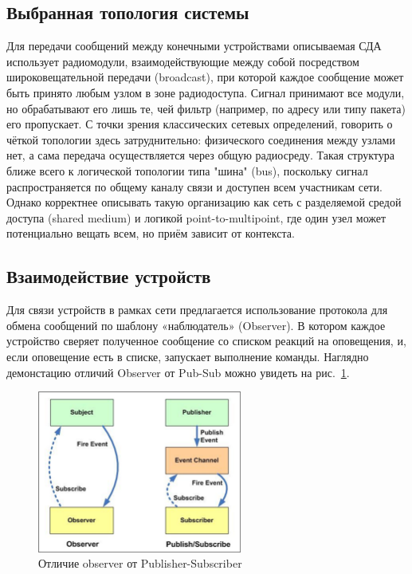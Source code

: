 \documentclass[a4paper,12pt]{article}
\begin{document}
\subsection{Выбранная топология системы}
Для передачи сообщений между конечными устройствами описываемая СДА использует радиомодули, взаимодействующие между собой посредством широковещательной передачи (broadcast), при которой каждое сообщение может быть принято любым узлом в зоне радиодоступа. Сигнал принимают все модули, но обрабатывают его лишь те, чей фильтр (например, по адресу или типу пакета) его пропускает. С точки зрения классических сетевых определений, говорить о чёткой топологии здесь затруднительно: физического соединения между узлами нет, а сама передача осуществляется через общую радиосреду. Такая структура ближе всего к логической топологии типа "шина" (bus), поскольку сигнал распространяется по общему каналу связи и доступен всем участникам сети. Однако корректнее описывать такую организацию как сеть с разделяемой средой доступа (shared medium) и логикой point-to-multipoint, где один узел может потенциально вещать всем, но приём зависит от контекста.

\subsection{Взаимодействие устройств}
Для связи устройств в рамках сети предлагается использование протокола для обмена сообщений по шаблону «наблюдатель» (Observer). В котором каждое устройство сверяет полученное сообщение со списком реакций на оповещения, и, если оповещение есть в списке, запускает выполнение команды. Наглядно демонстацию отличий Observer от Pub-Sub можно увидеть на рис.~\ref{fig:Observer_vs_pub_sub}.

\begin{figure}[h]
    \centering
    \includegraphics[width=0.6\textwidth]{images/Fig08.png}
    \caption{Отличие observer от Publisher-Subscriber \cite{IMG_observer_vs_pub_sub}}
    \label{fig:Observer_vs_pub_sub}
\end{figure}
\end{document}
